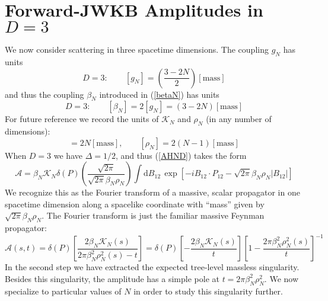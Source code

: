 \section{Forward-JWKB Amplitudes in $D = 3$\label{sec4}}
We now consider scattering in three spacetime dimensions. The coupling $g_{N}$ has units
\begin{equation}
	D = 3: \qquad [g_{N}] = \left( \frac{3 - 2N}{2} \right) [\text{mass}]
\end{equation}
and thus the coupling $\beta_{N}$ introduced in (\ref{betaN}) has units
\begin{equation}
	D = 3: \qquad [\beta_{N}] = 2[g_{N}] = \left(3 - 2N \right) [\text{mass}]
\end{equation}
For future reference we record the units of $\mathcal{K}_{N}$ and $\rho_{N}$ (in any number of dimensions):
\begin{equation}
	[\mathcal{K}_{N}] = 2N [\text{mass}], \qquad [\rho_{N}] = 2(N - 1) [\text{mass}]
\end{equation}
When $D = 3$ we have $\Delta = 1/2$, and thus (\ref{AHND}) takes the form
\begin{equation}
	\mathcal{A} = \beta_{N} \mathcal{K}_{N} \delta(P) \left( \frac{\sqrt{2 \pi}}{\sqrt{2 \pi} \beta_{N} \rho_{N}} \right) \int \mathrm{d}B_{1 2} \, \exp{\left[-i B_{12} \cdot P_{12} - \sqrt{2\pi} \beta_{N} \rho_{N} \vert B_{1 2} \vert \right]}
\end{equation}
We recognize this as the Fourier transform of a massive, scalar propagator in one spacetime dimension along a spacelike coordinate with ``mass'' given by $\sqrt{2\pi} \beta_{N} \rho_{N}$. The Fourier transform is just the familiar massive Feynman propagator:
\begin{equation}
	\mathcal{A}(s, t) = \delta(P) \left[ \frac{2 \beta_{N} \mathcal{K}_{N}(s)}{2 \pi \beta_{N}^{2} \rho_{N}^{2}(s) - t} \right] = \delta(P) \left[- \frac{2 \beta_{N} \mathcal{K}_{N}(s)}{t} \right] \left[ 1 - \frac{2 \pi \beta_{N}^{2} \rho_{N}^{2}(s)}{t} \right]^{-1} \label{AHN3}
\end{equation}
In the second step we have extracted the expected tree-level massless singularity. Besides this singularity, the amplitude has a simple pole at $t = 2 \pi \beta_{N}^{2} \rho_{N}^{2}$. We now specialize to particular values of $N$ in order to study this singularity further.
